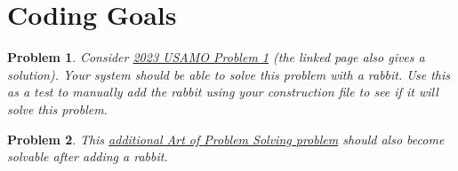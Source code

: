 \documentclass{article}
\newtheorem{problem}{Problem}
\begin{document}
\newpage

\section{Coding Goals}

\begin{problem}
        Consider \href{https://artofproblemsolving.com/wiki/index.php/2023_USAMO_Problems/Problem_1}{2023 USAMO Problem 1} (the linked page also gives a solution). Your system should be able to solve this problem with a rabbit. Use this as a test to manually add the rabbit using your construction file to see if it will solve this problem.
\end{problem}

\begin{problem}
    This \href{https://artofproblemsolving.com/community/c6h3215547p29415873}{additional Art of Problem Solving problem} should also become solvable after adding a rabbit.
\end{problem}
\end{document}
